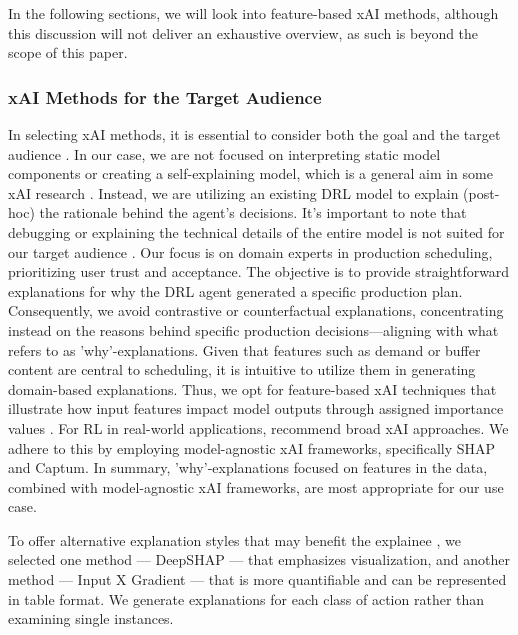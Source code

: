 In the following sections, we will look into feature-based xAI methods, although this discussion will not deliver an exhaustive overview, as such is beyond the scope of this paper.

\subsubsection{xAI Methods for the Target Audience}

In selecting xAI methods, it is essential to consider both the goal and the target audience . In our case, we are not focused on interpreting static model components or creating a self-explaining model, which is a general aim in some xAI research . Instead, we are utilizing an existing DRL model to explain (post-hoc) the rationale behind the agent's decisions. It's important to note that debugging or explaining the technical details of the entire model is not suited for our target audience . Our focus is on domain experts in production scheduling, prioritizing user trust and acceptance. The objective is to provide straightforward explanations for why the DRL agent generated a specific production plan. Consequently, we avoid contrastive or counterfactual explanations, concentrating instead on the reasons behind specific production decisions—aligning with what  refers to as 'why'-explanations. Given that features such as demand or buffer content are central to scheduling, it is intuitive to utilize them in generating domain-based explanations. Thus, we opt for feature-based xAI techniques that illustrate how input features impact model outputs through assigned importance values . For RL in real-world applications,  recommend broad xAI approaches. We adhere to this by employing model-agnostic xAI frameworks, specifically SHAP and Captum.
In summary, 'why'-explanations focused on features in the data, combined with model-agnostic xAI frameworks, are most appropriate for our use case.

To offer alternative explanation styles that may benefit the explainee , we selected one method — DeepSHAP — that emphasizes visualization, and another method — Input X Gradient — that is more quantifiable and can be represented in table format. We generate explanations for each class of action rather than examining single instances.

